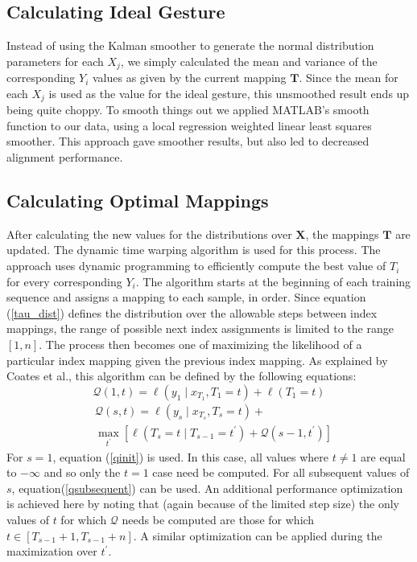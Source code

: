 \documentclass{article}
\begin{document}
\subsection{Calculating Ideal Gesture}

Instead of using the Kalman smoother to generate the normal distribution parameters
for each $X_j$, we simply calculated the mean and variance of the corresponding
$Y_i$ values as given by the current mapping $\mathbf{T}$. Since the mean for each
$X_j$ is used as the value for the ideal gesture, this unsmoothed result ends up being
quite choppy. To smooth things out we applied MATLAB's smooth function to our data,
using a local regression weighted linear least squares smoother. This approach gave
smoother results, but also led to decreased alignment performance.

\subsection{Calculating Optimal Mappings}

After calculating the new values for the distributions over $\mathbf{X}$, the mappings
$\mathbf{T}$ are updated. The dynamic time warping algorithm is used for this
process. The approach uses dynamic programming to efficiently compute the best
value of $T_i$ for every corresponding $Y_i$. The algorithm starts at the beginning
of each training sequence and assigns a mapping to each sample, in order. Since
equation (\ref{tau_dist}) defines the distribution over the allowable steps between
index mappings, the range of possible next index assignments is limited to the range
$\left[1,n\right]$. The process then becomes one of maximizing the likelihood of a
particular index mapping given the previous index mapping. As explained by Coates
et al., this algorithm can be defined by the following equations:
\begin{equation}
\label{qinit}
\mathcal{Q}\left(1,t\right)=\ell\left(y_1 \mid x_{T_1}, T_1=t\right)+\ell\left(T_1=t\right)
\end{equation}
\begin{equation}
\label{qsubsequent}
\begin{split}
&\mathcal{Q}\left(s,t\right) = \ell\left(y_s \mid x_{T_s}, T_s=t\right)+\\
&\max_{t^\prime}\left[\ell\left(T_s=t\mid T_{s-1}=t^\prime\right)+\mathcal{Q}\left(s-1,t^\prime\right)\right]
\end{split}
\end{equation}
For $s=1$, equation (\ref{qinit}) is used. In this case, all values where $t\neq1$ are
equal to $-\infty$ and so only the $t=1$ case need be computed. For all subsequent
values of $s$, equation(\ref{qsubsequent}) can be used. An additional performance
optimization is achieved here by noting that (again because of the limited step size)
the only values of $t$ for which $\mathcal{Q}$ needs be computed are those for which
$t\in\left[T_{s-1}+1,T_{s-1}+n\right]$. A similar optimization can be applied during the
maximization over $t^\prime$.
\end{document}
